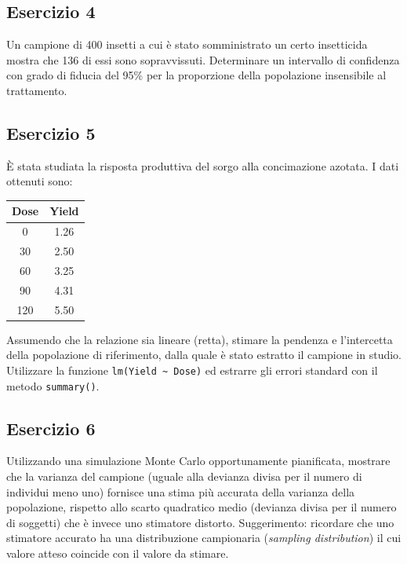 \documentclass[a4paper,12pt,oneside]{book}
\begin{document}
\hypertarget{esercizio-4-3}{%
\subsection{Esercizio 4}\label{esercizio-4-3}}

Un campione di 400 insetti a cui è stato somministrato un certo insetticida mostra che 136 di essi sono sopravvissuti. Determinare un intervallo di confidenza con grado di fiducia del 95\% per la proporzione della popolazione insensibile al trattamento.

\hypertarget{esercizio-5-3}{%
\subsection{Esercizio 5}\label{esercizio-5-3}}

È stata studiata la risposta produttiva del sorgo alla concimazione azotata. I dati ottenuti sono:

\begin{longtable}[]{@{}cc@{}}
\toprule()
Dose & Yield \\
\midrule()
\endhead
0 & 1.26 \\
30 & 2.50 \\
60 & 3.25 \\
90 & 4.31 \\
120 & 5.50 \\
\bottomrule()
\end{longtable}

Assumendo che la relazione sia lineare (retta), stimare la pendenza e l'intercetta della popolazione di riferimento, dalla quale è stato estratto il campione in studio. Utilizzare la funzione \texttt{lm(Yield\ \textasciitilde{}\ Dose)} ed estrarre gli errori standard con il metodo \texttt{summary()}.

\hypertarget{esercizio-6-1}{%
\subsection{Esercizio 6}\label{esercizio-6-1}}

Utilizzando una simulazione Monte Carlo opportunamente pianificata, mostrare che la varianza del campione (uguale alla devianza divisa per il numero di individui meno uno) fornisce una stima più accurata della varianza della popolazione, rispetto allo scarto quadratico medio (devianza divisa per il numero di soggetti) che è invece uno stimatore distorto. Suggerimento: ricordare che uno stimatore accurato ha una distribuzione campionaria (\emph{sampling distribution}) il cui valore atteso coincide con il valore da stimare.
\end{document}
